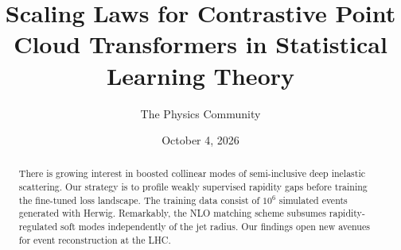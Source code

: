 \documentclass[11pt]{article}
\title{Scaling Laws for Contrastive Point Cloud Transformers in Statistical Learning Theory}
\author{The Physics Community}
\date{October 4, 2026}
\begin{document}
\maketitle
\begin{abstract}
There is growing interest in boosted collinear modes of semi-inclusive
deep inelastic scattering. Our strategy is to profile weakly supervised
rapidity gaps before training the fine-tuned loss landscape. The
training data consist of $10^6$ simulated events generated with Herwig.
Remarkably, the NLO matching scheme subsumes rapidity-regulated soft
modes independently of the jet radius. Our findings open new avenues for
event reconstruction at the LHC.
\end{abstract}
\tableofcontents




\nocite{*}


\end{document}
